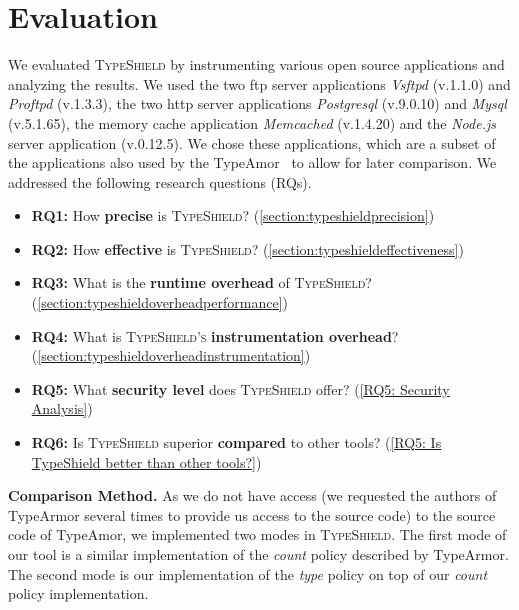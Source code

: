 \section{Evaluation}
\label{chapter:Evaluation}
We evaluated \textsc{TypeShield} by instrumenting various open source applications and analyzing the results. 
We used the two ftp server applications \textit{Vsftpd} (v.1.1.0) and \textit{Proftpd} (v.1.3.3), the two http server 
applications \textit{Postgresql} (v.9.0.10) and \textit{Mysql} (v.5.1.65), the memory cache application \textit{Memcached} (v.1.4.20) 
and the \textit{Node.js} server application (v.0.12.5). We chose these applications, which are a subset of the 
applications also used by the TypeAmor~\cite{veen:typearmor} to allow for later comparison.
We addressed the following research questions (RQs).

\begin{itemize}[leftmargin=.12in]
 \item \textbf{RQ1:} How \textbf{precise} is \textsc{TypeShield}? (\cref{section:typeshieldprecision})
 \item \textbf{RQ2:} How \textbf{effective} is \textsc{TypeShield}? (\cref{section:typeshieldeffectiveness})
 \item \textbf{RQ3:} What is the \textbf{runtime overhead} of \textsc{TypeShield}? (\cref{section:typeshieldoverheadperformance})
 \item \textbf{RQ4:} What is \textsc{TypeShield's} \textbf{instrumentation overhead}? (\cref{section:typeshieldoverheadinstrumentation})
 \item \textbf{RQ5:} What \textbf{security level} does \textsc{TypeShield} offer? (\cref{RQ5: Security Analysis})
 \item \textbf{RQ6:} Is \textsc{TypeShield} superior \textbf{compared} to other tools? (\cref{RQ5: Is TypeShield better than other tools?})
\end{itemize}
\textbf{Comparison Method.} As we do not have access (we requested the authors of TypeArmor several times to provide us access to the source code) 
to the source code of TypeAmor, we implemented two modes in \textsc{TypeShield}. 
The first mode of our tool is a similar implementation of the \textit{count} 
policy described by TypeArmor. The second mode is our implementation of the \textit{type} policy on
top of our \textit{count} policy implementation. 
%

